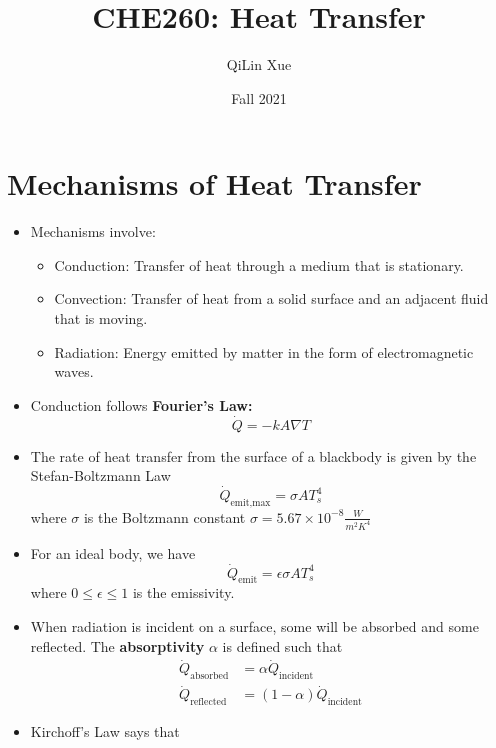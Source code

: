 \documentclass{article}
\title{CHE260: Heat Transfer}
\author{QiLin Xue}
\date{Fall 2021}
\begin{document}
\maketitle
\section{Mechanisms of Heat Transfer}
\begin{itemize}
        \item Mechanisms involve:
        \begin{itemize}
            \item Conduction: Transfer of heat through a medium that is stationary.
            \item Convection: Transfer of heat from a solid surface and an adjacent fluid that is moving.
            \item Radiation: Energy emitted by matter in the form of electromagnetic waves.
        \end{itemize}
        \item Conduction follows \textbf{Fourier's Law:}
        \begin{equation}
            \dot{Q} = - k A \nabla T
        \end{equation}
        \item The rate of heat transfer from the surface of a blackbody is given by the Stefan-Boltzmann Law 
        \begin{equation}
            \dot{Q}_\text{emit,max} = \sigma A T_s^4
        \end{equation}
        where $\sigma$ is the Boltzmann constant $\sigma = 5.67 \times 10^{-8} \frac{W}{m^2 K^4}$
        \item For an ideal body, we have
        \begin{equation}
            \dot{Q}_\text{emit} = \epsilon \sigma AT_s^4
        \end{equation}
        where $0 \le \epsilon \le 1$ is the emissivity.
        \item When radiation is incident on a surface, some will be absorbed and some reflected. The \textbf{absorptivity} $\alpha$ is defined such that
        \begin{align}
            \dot{Q}_\text{absorbed} &= \alpha \dot{Q}_\text{incident} \\ 
            \dot{Q}_\text{reflected} &= (1-\alpha)\dot{Q}_\text{incident}
        \end{align}
        \item Kirchoff's Law says that

\end{itemize}
\end{document}
